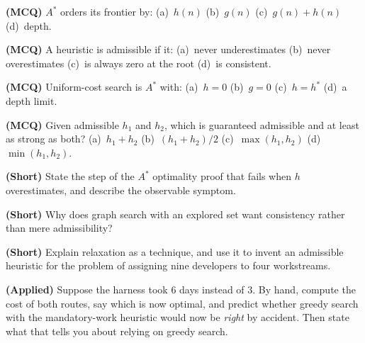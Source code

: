 \begin{reviewq}
  \item \textbf{(MCQ)} $A^{*}$ orders its frontier by: (a)~$h(n)$ (b)~$g(n)$
        (c)~$g(n)+h(n)$ (d)~depth.
  \item \textbf{(MCQ)} A heuristic is admissible if it: (a)~never underestimates
        (b)~never overestimates (c)~is always zero at the root (d)~is consistent.
  \item \textbf{(MCQ)} Uniform-cost search is $A^{*}$ with: (a)~$h=0$
        (b)~$g=0$ (c)~$h=h^{*}$ (d)~a depth limit.
  \item \textbf{(MCQ)} Given admissible $h_{1}$ and $h_{2}$, which is guaranteed
        admissible and at least as strong as both? (a)~$h_{1}+h_{2}$
        (b)~$(h_{1}+h_{2})/2$ (c)~$\max(h_{1},h_{2})$ (d)~$\min(h_{1},h_{2})$.
  \item \textbf{(Short)} State the step of the $A^{*}$ optimality proof that fails
        when $h$ overestimates, and describe the observable symptom.
  \item \textbf{(Short)} Why does graph search with an explored set want consistency
        rather than mere admissibility?
  \item \textbf{(Short)} Explain relaxation as a technique, and use it to invent an
        admissible heuristic for the problem of assigning nine developers to four
        workstreams.
  \item \textbf{(Applied)} Suppose the harness took $6$ days instead of $3$. By
        hand, compute the cost of both routes, say which is now optimal, and predict
        whether greedy search with the mandatory-work heuristic would now be
        \emph{right} by accident. Then state what that tells you about relying on
        greedy search.
\end{reviewq}
